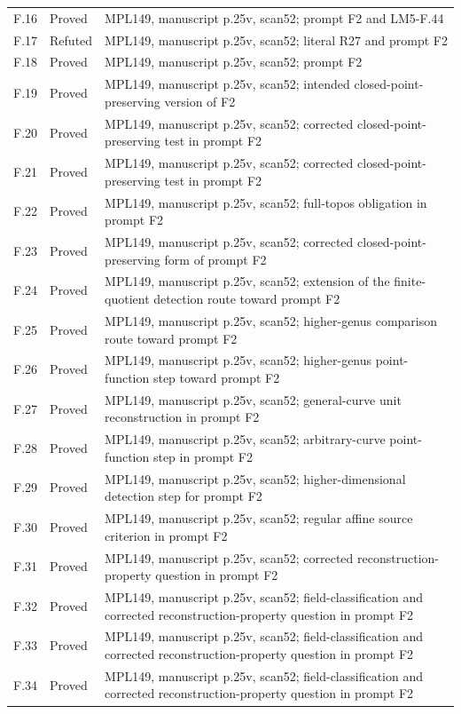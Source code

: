 {\begin{longtable}{p{1.9cm}p{1.7cm}p{10.3cm}}
F.16 & Proved & MPL149, manuscript p.25v, scan52; prompt F2 and LM5-F.44 \\
F.17 & Refuted & MPL149, manuscript p.25v, scan52; literal R27 and prompt F2 \\
F.18 & Proved & MPL149, manuscript p.25v, scan52; prompt F2 \\
F.19 & Proved & MPL149, manuscript p.25v, scan52; intended closed-point-preserving version of F2 \\
F.20 & Proved & MPL149, manuscript p.25v, scan52; corrected closed-point-preserving test in prompt F2 \\
F.21 & Proved & MPL149, manuscript p.25v, scan52; corrected closed-point-preserving test in prompt F2 \\
F.22 & Proved & MPL149, manuscript p.25v, scan52; full-topos obligation in prompt F2 \\
F.23 & Proved & MPL149, manuscript p.25v, scan52; corrected closed-point-preserving form of prompt F2 \\
F.24 & Proved & MPL149, manuscript p.25v, scan52; extension of the finite-quotient detection route toward prompt F2 \\
F.25 & Proved & MPL149, manuscript p.25v, scan52; higher-genus comparison route toward prompt F2 \\
F.26 & Proved & MPL149, manuscript p.25v, scan52; higher-genus point-function step toward prompt F2 \\
F.27 & Proved & MPL149, manuscript p.25v, scan52; general-curve unit reconstruction in prompt F2 \\
F.28 & Proved & MPL149, manuscript p.25v, scan52; arbitrary-curve point-function step in prompt F2 \\
F.29 & Proved & MPL149, manuscript p.25v, scan52; higher-dimensional detection step for prompt F2 \\
F.30 & Proved & MPL149, manuscript p.25v, scan52; regular affine source criterion in prompt F2 \\
F.31 & Proved & MPL149, manuscript p.25v, scan52; corrected reconstruction-property question in prompt F2 \\
F.32 & Proved & MPL149, manuscript p.25v, scan52; field-classification and corrected reconstruction-property question in prompt F2 \\
F.33 & Proved & MPL149, manuscript p.25v, scan52; field-classification and corrected reconstruction-property question in prompt F2 \\
F.34 & Proved & MPL149, manuscript p.25v, scan52; field-classification and corrected reconstruction-property question in prompt F2 \\

\end{longtable}}
